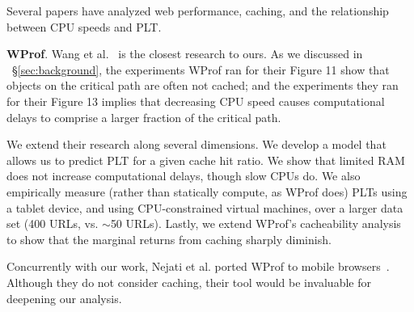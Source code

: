 

Several papers have analyzed web performance, caching, and the relationship
between CPU speeds and PLT.

\textbf{WProf}. Wang et al.~\cite{wang2013demystifying} is the closest research to ours. As we discussed in ~\S\ref{sec:background}, the experiments WProf ran for their Figure 11 show that objects on the critical path are often not cached; and the experiments they ran for their
Figure 13 implies that decreasing CPU speed causes computational delays to comprise a larger fraction of the critical path.

We extend their research along several dimensions.
We develop a model that allows us to predict PLT for a given cache hit ratio. We show that limited RAM does not increase computational delays, though slow CPUs do. We also empirically measure (rather than statically compute, as WProf does) PLTs using a tablet device, and using CPU-constrained virtual machines, over a larger data set (400 URLs, vs. {\footnotesize$\sim$}50 URLs).
Lastly, we extend WProf's cacheability analysis to show that the
marginal returns from caching sharply diminish.

Concurrently with our work, Nejati et al. ported WProf to mobile browsers~\cite{nejati2016depth}. Although they do not consider caching, their tool would be invaluable for deepening our analysis.



